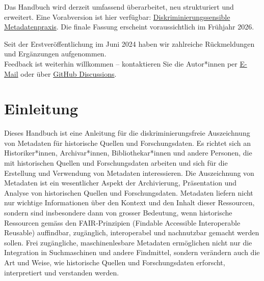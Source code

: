 \documentclass[
  nswissgerman,
  letterpaper,
  DIV=11,
  numbers=noendperiod]{scrartcl}
\begin{document}
\begin{tcolorbox}[enhanced jigsaw, arc=.35mm, bottomrule=.15mm, bottomtitle=1mm, breakable, colback=white, colbacktitle=quarto-callout-important-color!10!white, colframe=quarto-callout-important-color-frame, coltitle=black, left=2mm, leftrule=.75mm, opacityback=0, opacitybacktitle=0.6, rightrule=.15mm, title=\textcolor{quarto-callout-important-color}{\faExclamation}\hspace{0.5em}{Überarbeitung des Handbuchs}, titlerule=0mm, toprule=.15mm, toptitle=1mm]

Das Handbuch wird derzeit umfassend überarbeitet, neu strukturiert und
erweitert. Eine Vorabversion ist hier verfügbar:
\href{https://moritz-maehr.quarto.pub/diskriminierungssensible-metadatenpraxis/}{Diskriminierungssensible
Metadatenpraxis}. Die finale Fassung erscheint voraussichtlich im
Frühjahr 2026.

Seit der Erstveröffentlichung im Juni 2024 haben wir zahlreiche
Rückmeldungen und Ergänzungen aufgenommen.\\
Feedback ist weiterhin willkommen -- kontaktieren Sie die Autor*innen
per
\href{https://maehr.github.io/diskriminierungsfreie-metadaten/}{E-Mail}
oder über
\href{https://github.com/maehr/diskriminierungsfreie-metadaten/discussions/4\#discussioncomment-10626797}{GitHub
Discussions}.

\end{tcolorbox}

\section{Einleitung}\label{einleitung}

Dieses Handbuch ist eine Anleitung für die diskriminierungsfreie
Auszeichnung von Metadaten für historische Quellen und Forschungsdaten.
Es richtet sich an Historiker*innen, Archivar*innen, Bibliothekar*innen
und andere Personen, die mit historischen Quellen und Forschungsdaten
arbeiten und sich für die Erstellung und Verwendung von Metadaten
interessieren. Die Auszeichnung von Metadaten ist ein wesentlicher
Aspekt der Archivierung, Präsentation und Analyse von historischen
Quellen und Forschungsdaten. Metadaten liefern nicht nur wichtige
Informationen über den Kontext und den Inhalt dieser Ressourcen, sondern
sind insbesondere dann von grosser Bedeutung, wenn historische
Ressourcen gemäss den FAIR-Prinzipien (Findable Accessible Interoperable
Reusable) auffindbar, zugänglich, interoperabel und nachnutzbar gemacht
werden sollen. Frei zugängliche, maschinenlesbare Metadaten ermöglichen
nicht nur die Integration in Suchmaschinen und andere Findmittel,
sondern verändern auch die Art und Weise, wie historische Quellen und
Forschungsdaten erforscht, interpretiert und verstanden werden.
\end{document}
